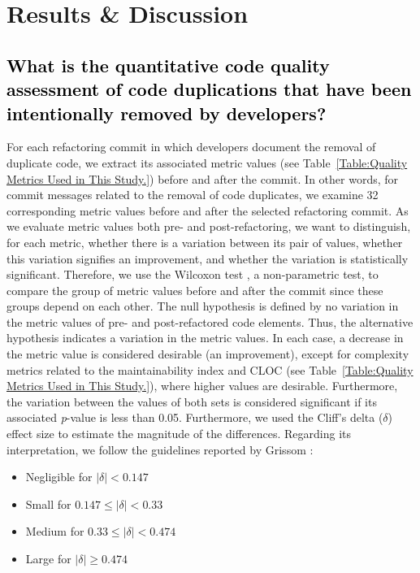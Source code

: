 \section{Results \& Discussion}
\label{Section:Result}
\subsection{\textcolor{black}{What is the quantitative code quality assessment of code duplications that have been intentionally removed by developers?}}
For each refactoring commit in which developers document the removal of duplicate code, we extract its associated metric values  (see Table~\ref{Table:Quality Metrics Used in This Study.}) before and after the commit. 
 In other words, for commit messages related to the removal of code duplicates, we examine 32 corresponding metric values before and after the selected refactoring commit. As we evaluate metric values both pre- and post-refactoring, we want to distinguish, for each metric, whether there is a variation between its pair of values, whether this variation signifies an improvement, and whether the variation is statistically significant. Therefore, we use the Wilcoxon test \citep{wilcoxon1945individual}, a non-parametric test, to compare the group of metric values before and after the commit since these groups depend on each other. The null hypothesis is defined by no variation in the metric values of pre- and post-refactored code elements. Thus, the alternative hypothesis indicates a variation in the metric values. In each case, a decrease in the metric value is considered desirable (\ie an improvement), except for complexity metrics related to the maintainability index and CLOC (see Table~\ref{Table:Quality Metrics Used in This Study.}), where higher values are desirable. Furthermore, the variation between the values of both sets is considered significant if its associated \textit{p}-value is less than 0.05. Furthermore, we used the Cliff's delta ($\delta$) effect size to estimate the magnitude of the differences. Regarding its interpretation, we follow the guidelines reported by Grissom \etal \citep{trove.nla.gov.au/work/16432558}:

 \begin{itemize}
\item Negligible for $\mid \delta \mid< 0.147$
\item Small for $0.147 \leq \mid \delta \mid < 0.33$
\item Medium for $0.33 \leq \mid \delta \mid < 0.474$
\item Large for $\mid \delta \mid \geq 0.474$
\end{itemize}

